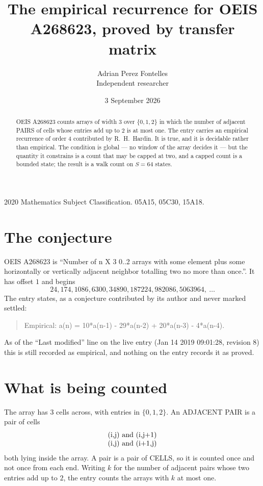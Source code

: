 \documentclass[11pt,a4paper]{article}
\title{The empirical recurrence for OEIS A268623, proved by transfer matrix}
\author{Adrian Perez Fontelles\\ \small Independent researcher}
\date{3 September 2026}
\theoremstyle{plain}
\theoremstyle{definition}
\begin{document}
\maketitle

\begin{abstract}
OEIS A268623 counts arrays of width $3$ over $\{0,1,2\}$ in which the number of adjacent PAIRS of
cells whose entries add up to $2$ is at most one. The entry carries an empirical recurrence of
order $4$ contributed by R.~H.~Hardin. It is true, and it is decidable rather than
empirical. The condition is global --- no window of the array decides it --- but the quantity
it constrains is a count that may be capped at two, and a capped count is a bounded state; the
result is a walk count on $S=64$ states.
\end{abstract}

\noindent\small 2020 Mathematics Subject Classification. 05A15, 05C30, 15A18.\normalsize

\section{The conjecture}

OEIS A268623 is ``Number of n X 3 0..2 arrays with some element plus some horizontally or vertically adjacent neighbor totalling two no more than once.''. It has offset $1$ and begins
\[
24, 174, 1086, 6300, 34890, 187224, 982086, 5063964,\ \dots
\]
The entry states, as a conjecture contributed by its author and never marked settled:
\begin{quote}
Empirical: a(n) = 10*a(n-1) - 29*a(n-2) + 20*a(n-3) - 4*a(n-4).
\end{quote}
As of the ``Last modified'' line on the live entry (Jan 14 2019 09:01:28, revision 8) this is still
recorded as empirical, and nothing on the entry records it as proved.

\section{What is being counted}

The array has $3$ cells across, with entries in $\{0,1,2\}$. An ADJACENT PAIR is a pair of cells
\[
\begin{array}{l}
$(i,j)\text{ and }(i,j{+}1)$ \\
$(i,j)\text{ and }(i{+}1,j)$ \\
\end{array}
\]
both lying inside the array. A pair is a pair of CELLS, so it is counted once and not once from
each end. Writing $k$ for the number of adjacent pairs whose two entries add up to $2$, the
entry counts the arrays with $k$ at most one.
\end{document}
